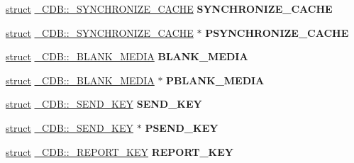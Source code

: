 \begin{DoxyCompactItemize}
\hyperlink{interfacestruct}{struct} \hyperlink{struct___c_d_b_1_1___s_y_n_c_h_r_o_n_i_z_e___c_a_c_h_e}{\+\_\+\+C\+D\+B\+::\+\_\+\+S\+Y\+N\+C\+H\+R\+O\+N\+I\+Z\+E\+\_\+\+C\+A\+C\+HE} {\bfseries S\+Y\+N\+C\+H\+R\+O\+N\+I\+Z\+E\+\_\+\+C\+A\+C\+HE}
\item 
\mbox{\label{union___c_d_b_a97f26e44e8a37df90b16383011671e19}} 
\hyperlink{interfacestruct}{struct} \hyperlink{struct___c_d_b_1_1___s_y_n_c_h_r_o_n_i_z_e___c_a_c_h_e}{\+\_\+\+C\+D\+B\+::\+\_\+\+S\+Y\+N\+C\+H\+R\+O\+N\+I\+Z\+E\+\_\+\+C\+A\+C\+HE} $\ast$ {\bfseries P\+S\+Y\+N\+C\+H\+R\+O\+N\+I\+Z\+E\+\_\+\+C\+A\+C\+HE}
\item 
\mbox{\label{union___c_d_b_ada67d123a35d75cf004f2c71a0073e15}} 
\hyperlink{interfacestruct}{struct} \hyperlink{struct___c_d_b_1_1___b_l_a_n_k___m_e_d_i_a}{\+\_\+\+C\+D\+B\+::\+\_\+\+B\+L\+A\+N\+K\+\_\+\+M\+E\+D\+IA} {\bfseries B\+L\+A\+N\+K\+\_\+\+M\+E\+D\+IA}
\item 
\mbox{\label{union___c_d_b_a0f48dc8f3a9dce6354efbc58c97a0d74}} 
\hyperlink{interfacestruct}{struct} \hyperlink{struct___c_d_b_1_1___b_l_a_n_k___m_e_d_i_a}{\+\_\+\+C\+D\+B\+::\+\_\+\+B\+L\+A\+N\+K\+\_\+\+M\+E\+D\+IA} $\ast$ {\bfseries P\+B\+L\+A\+N\+K\+\_\+\+M\+E\+D\+IA}
\item 
\mbox{\label{union___c_d_b_a69ca93396752dca14d12722cbd94fc70}} 
\hyperlink{interfacestruct}{struct} \hyperlink{struct___c_d_b_1_1___s_e_n_d___k_e_y}{\+\_\+\+C\+D\+B\+::\+\_\+\+S\+E\+N\+D\+\_\+\+K\+EY} {\bfseries S\+E\+N\+D\+\_\+\+K\+EY}
\item 
\mbox{\label{union___c_d_b_a327c7f2bc0650a34ae75308fc50241e1}} 
\hyperlink{interfacestruct}{struct} \hyperlink{struct___c_d_b_1_1___s_e_n_d___k_e_y}{\+\_\+\+C\+D\+B\+::\+\_\+\+S\+E\+N\+D\+\_\+\+K\+EY} $\ast$ {\bfseries P\+S\+E\+N\+D\+\_\+\+K\+EY}
\item 
\mbox{\label{union___c_d_b_abdaf68cb7f3f0744dd94a58e364d36d7}} 
\hyperlink{interfacestruct}{struct} \hyperlink{struct___c_d_b_1_1___r_e_p_o_r_t___k_e_y}{\+\_\+\+C\+D\+B\+::\+\_\+\+R\+E\+P\+O\+R\+T\+\_\+\+K\+EY} {\bfseries R\+E\+P\+O\+R\+T\+\_\+\+K\+EY}
\item 
\mbox{\label{union___c_d_b_a02840e95d580891628bb69c321e71cb3}} 

\end{DoxyCompactItemize}
